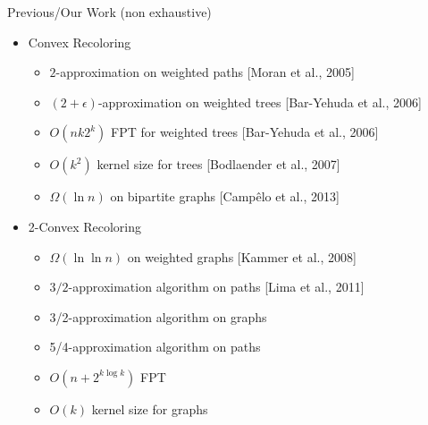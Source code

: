 \def\refsize{\tiny}

\begin{frame}{Previous/\alert{Our} Work (non exhaustive)}
\begin{itemize}
\item
Convex Recoloring
\begin{itemize}

\pause\item
$2$-approximation on weighted paths 
{\refsize[Moran et al., 2005]}

\pause\item
$(2 + \epsilon)$-approximation on weighted trees 
{\refsize[Bar-Yehuda et al., 2006]}

\pause\item
$O(n k 2^{k})$ FPT for weighted trees
{\refsize[Bar-Yehuda et al., 2006]}

\pause\item
$O(k^2)$ kernel size for trees
{\refsize[Bodlaender et al., 2007]}

\pause\item
$\Omega(\ln{n})$ on bipartite graphs
{\refsize[Camp\^elo et al., 2013]}


\end{itemize}
\pause\item
2-Convex Recoloring
\begin{itemize}


\pause\item
$\Omega(\ln\ln{n})$ on weighted graphs
{\refsize[Kammer et al., 2008]}

\pause\item
$3/2$-approximation algorithm on paths
{\refsize[Lima et al., 2011]}

\pause\item
\alert{3/2-approximation algorithm on graphs}

\pause\item
\alert{5/4-approximation algorithm on paths}

\pause\item
\alert{$O(n + 2^{k\log k})$ FPT}

\pause\item
\alert{$O(k)$ kernel size for graphs}


\end{itemize}
\end{itemize}
\end{frame}
